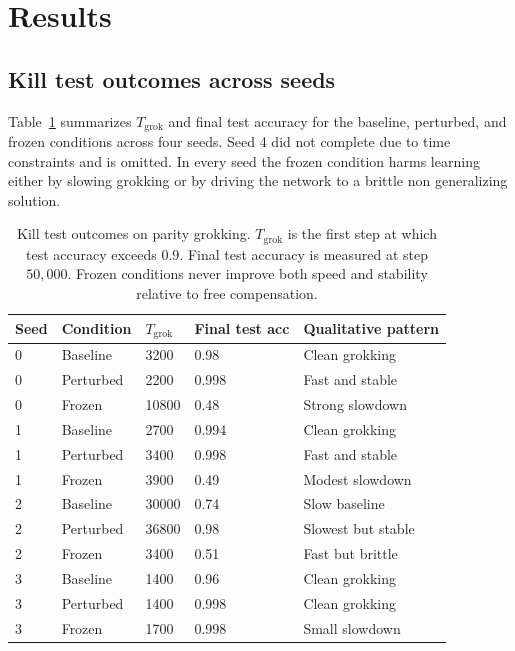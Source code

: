 \section{Results}

\subsection{Kill test outcomes across seeds}

Table~\ref{tab:killtest} summarizes $T_{\text{grok}}$ and final test accuracy for the baseline, perturbed, and frozen conditions across four seeds. Seed 4 did not complete due to time constraints and is omitted. In every seed the frozen condition harms learning either by slowing grokking or by driving the network to a brittle non generalizing solution.

\begin{table}[t]
\centering
\begin{tabular}{lllll}
\toprule
Seed & Condition & $T_{\text{grok}}$ & Final test acc & Qualitative pattern \\\midrule
0 & Baseline & 3200 & 0.98 & Clean grokking \\
0 & Perturbed & 2200 & 0.998 & Fast and stable \\
0 & Frozen & 10800 & 0.48 & Strong slowdown \\
1 & Baseline & 2700 & 0.994 & Clean grokking \\
1 & Perturbed & 3400 & 0.998 & Fast and stable \\
1 & Frozen & 3900 & 0.49 & Modest slowdown \\
2 & Baseline & 30000 & 0.74 & Slow baseline \\
2 & Perturbed & 36800 & 0.98 & Slowest but stable \\
2 & Frozen & 3400 & 0.51 & Fast but brittle \\
3 & Baseline & 1400 & 0.96 & Clean grokking \\
3 & Perturbed & 1400 & 0.998 & Clean grokking \\
3 & Frozen & 1700 & 0.998 & Small slowdown \\\bottomrule
\end{tabular}
\caption{Kill test outcomes on parity grokking. $T_{\text{grok}}$ is the first step at which test accuracy exceeds $0.9$. Final test accuracy is measured at step $50{,}000$. Frozen conditions never improve both speed and stability relative to free compensation.}
\label{tab:killtest}
\end{table}

